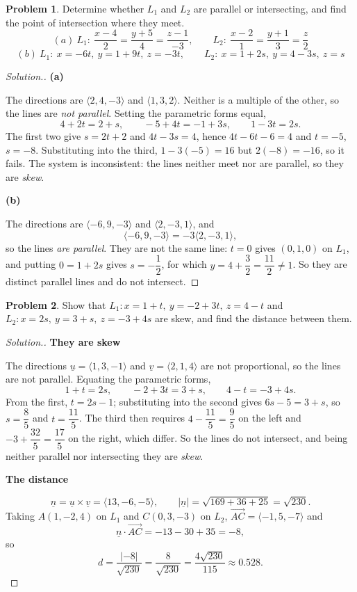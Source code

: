 \documentclass[11pt,a4paper]{article}
\theoremstyle{definition}
\newtheorem{problemx}{Problem}[subsection]
\newenvironment{problem}{\begin{problemx}}{\end{problemx}}
\newenvironment{solution}
  {\renewcommand{\qedsymbol}{}\begin{proof}[\textit{Solution}.]}
  {\end{proof}}
\newcommand{\subhead}[1]{%
  \par\medskip\noindent\textbf{#1}\par\nobreak\smallskip}
\begin{document}
\begin{problem}
Determine whether $L_1$ and $L_2$ are parallel or intersecting, and find the
point of intersection where they meet.
$$(a)\ L_1:\ \frac{x-4}{2} = \frac{y+5}{4} = \frac{z-1}{-3},\qquad
L_2:\ \frac{x-2}{1} = \frac{y+1}{3} = \frac{z}{2}$$
$$(b)\ L_1:\ x=-6t,\ y=1+9t,\ z=-3t,\qquad
L_2:\ x=1+2s,\ y=4-3s,\ z=s$$
\end{problem}
\begin{solution}
\subhead{(a)}
The directions are $\langle 2,4,-3\rangle$ and $\langle 1,3,2\rangle$. Neither
is a multiple of the other, so the lines are \emph{not parallel}. Setting the
parametric forms equal,
$$4+2t = 2+s,\qquad -5+4t = -1+3s,\qquad 1-3t = 2s .$$
The first two give $s = 2t+2$ and $4t-3s = 4$, hence
$4t - 6t - 6 = 4$ and $t = -5$, $s = -8$. Substituting into the third,
$1-3(-5) = 16$ but $2(-8) = -16$, so it fails. The system is inconsistent: the
lines neither meet nor are parallel, so they are \emph{skew}.

\subhead{(b)}
The directions are $\langle -6,9,-3\rangle$ and $\langle 2,-3,1\rangle$, and
$$\langle -6,9,-3\rangle = -3\langle 2,-3,1\rangle ,$$
so the lines \emph{are parallel}. They are not the same line: $t=0$ gives
$(0,1,0)$ on $L_1$, and putting $0 = 1+2s$ gives $s = -\dfrac12$, for which
$y = 4+\dfrac32 = \dfrac{11}{2}\neq 1$. So they are distinct parallel lines and
do not intersect.
\end{solution}

\begin{problem}
Show that $L_1: x=1+t,\ y=-2+3t,\ z=4-t$ and
$L_2: x=2s,\ y=3+s,\ z=-3+4s$ are skew, and find the distance between them.
\end{problem}
\begin{solution}
\subhead{They are skew}
The directions $\underline{u} = \langle 1,3,-1\rangle$ and
$\underline{v} = \langle 2,1,4\rangle$ are not proportional, so the lines are
not parallel. Equating the parametric forms,
$$1+t = 2s,\qquad -2+3t = 3+s,\qquad 4-t = -3+4s .$$
From the first, $t = 2s-1$; substituting into the second gives
$6s-5 = 3+s$, so $s = \dfrac85$ and $t = \dfrac{11}{5}$. The third then requires
$4 - \dfrac{11}{5} = \dfrac95$ on the left and $-3 + \dfrac{32}{5} = \dfrac{17}{5}$
on the right, which differ. So the lines do not intersect, and being neither
parallel nor intersecting they are \emph{skew}.

\subhead{The distance}
$$\underline{n} = \underline{u}\times\underline{v} = \langle 13,-6,-5\rangle,
\qquad \left|\underline{n}\right| = \sqrt{169+36+25} = \sqrt{230}.$$
Taking $A(1,-2,4)$ on $L_1$ and $C(0,3,-3)$ on $L_2$,
$\overrightarrow{AC} = \langle -1,5,-7\rangle$ and
$$\underline{n}\cdot\overrightarrow{AC} = -13 - 30 + 35 = -8 ,$$
so
$$d = \frac{\left|-8\right|}{\sqrt{230}} = \frac{8}{\sqrt{230}}
= \frac{4\sqrt{230}}{115}\approx 0.528 .$$
\end{solution}
\end{document}

